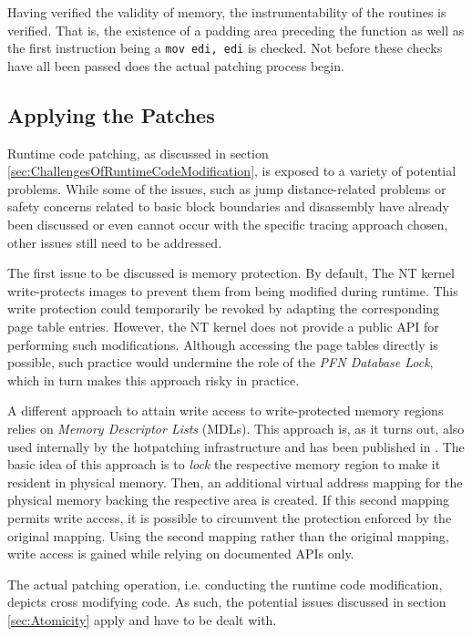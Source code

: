 Having verified the validity of memory, the instrumentability of the routines is 
verified. That is, the existence of a padding area preceding the function as well
as the first instruction being a \verb|mov edi, edi| is checked. Not before these 
checks have all been passed does the actual patching process begin.

\subsection{Applying the Patches}
\label{sec:ApplyingThePatches}
Runtime code patching, as discussed in section \ref{sec:ChallengesOfRuntimeCodeModification},
is exposed to a variety of potential problems. While some of the issues, such
as jump distance-related problems or safety concerns related to basic block boundaries
and disassembly have already been discussed or even cannot occur with the specific 
tracing approach chosen, other issues still need to be addressed.

The first issue to be discussed is memory protection. By default, The NT kernel write-protects 
images to prevent them from being modified during runtime. This write protection could
temporarily be revoked by adapting the corresponding page table entries. However, 
the NT kernel does not provide a public API for performing such modifications. 
Although accessing the page tables directly is possible, such practice would undermine
the role of the \emph{PFN Database Lock}, which in turn makes this approach risky in practice.

A different approach to attain write access to write-protected memory regions relies
on \emph{Memory Descriptor Lists} (MDLs). This approach is, as it turns out, also used internally by the hotpatching
infrastructure and has been published in \cite{Hoglund05}. The basic idea of this
approach is to \emph{lock} the respective memory region to make it resident in physical memory.
Then, an additional virtual address mapping for the physical memory backing the respective
area is created. If this second mapping permits write access, it is possible to circumvent
the protection enforced by the original mapping. Using the second mapping rather than 
the original mapping, write access is gained while relying on documented APIs only.

The actual patching operation, i.e. conducting the runtime code modification,
depicts cross modifying code. As such, the potential issues discussed in 
section \ref{sec:Atomicity} apply and have to be dealt with.

